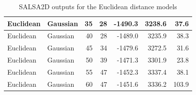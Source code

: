 \begin{table}[!htb]
\begin{longtable}{|l|l|r|r|r|r|r|}
\hline
Euclidean & Gaussian & 35 & 28 & -1490.3 & 3238.6 & 37.6\\
\hline
Euclidean & Gaussian & 40 & 28 & -1489.0 & 3235.9 & 38.3\\
\hline
Euclidean & Gaussian & 45 & 34 & -1479.6 & 3272.5 & 31.6\\
\hline
Euclidean & Gaussian & 50 & 39 & -1471.3 & 3301.9 & 23.8\\
\hline
Euclidean & Gaussian & 55 & 47 & -1452.3 & 3337.4 & 38.1\\
\hline
Euclidean & Gaussian & 60 & 47 & -1451.6 & 3336.2 & 103.9\\
\hline
\end{longtable}
\caption{SALSA2D outputs for the Euclidean distance models}
\label{tab:outputseuc}
\end{table}

